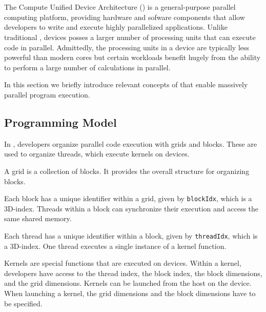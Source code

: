 \section{\cuda}
The Compute Unified Device Architecture (\cuda) is a general-purpose parallel computing platform, providing hardware and sofware components that allow developers to write and execute highly parallelized applications.
Unlike traditional , \cuda devices posses a larger number of processing units that can execute code in parallel.
Admittedly, the processing units in a \cuda device are typically less powerful than modern \cpu{} cores but certain workloads benefit hugely from the ability to perform a large number of calculations in parallel.

In this section we briefly introduce relevant concepts of \cuda that enable massively parallel program execution.

\subsection{Programming Model}
In \cuda, developers organize parallel code execution with grids and blocks.
These are used to organize threads, which execute kernels on \cuda devices.

A grid is a collection of blocks.
It provides the overall structure for organizing blocks.

Each block has a unique identifier within a grid, given by \texttt{blockIdx}, which is a 3D-index\cite{hwu_programming_2023}.
Threads within a block can synchronize their execution and access the same shared memory.

Each thread has a unique identifier within a block, given by \texttt{threadIdx}, which is a 3D-index\cite{hwu_programming_2023}.
One thread executes a single instance of a kernel function.

Kernels are special functions that are executed on \cuda devices.
Within a kernel, developers have access to the thread index, the block index, the block dimensions, and the grid dimensions.
Kernels can be launched from the host on the device.
When launching a kernel, the grid dimensions and the block dimensions have to be specified\cite{hwu_programming_2023}.



